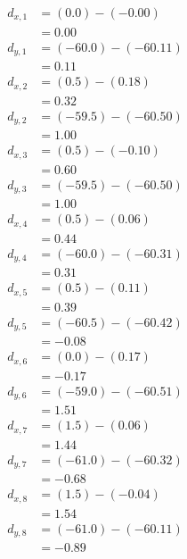 \documentclass[twocolumn]{article}
\begin{document}
\begin{align}
d_{x,1} &= (0.0) - (-0.00) \nonumber\\
 &= 0.00 \label{dx1}\\
d_{y,1} &= (-60.0) - (-60.11) \nonumber\\
 &= 0.11 \label{dy1}
\end{align}
\begin{align}
d_{x,2} &= (0.5) - (0.18) \nonumber\\
 &= 0.32 \label{dx2}\\
d_{y,2} &= (-59.5) - (-60.50) \nonumber\\
 &= 1.00 \label{dy2}
\end{align}
\begin{align}
d_{x,3} &= (0.5) - (-0.10) \nonumber\\
 &= 0.60 \label{dx3}\\
d_{y,3} &= (-59.5) - (-60.50) \nonumber\\
 &= 1.00 \label{dy3}
\end{align}
\begin{align}
d_{x,4} &= (0.5) - (0.06) \nonumber\\
 &= 0.44 \label{dx4}\\
d_{y,4} &= (-60.0) - (-60.31) \nonumber\\
 &= 0.31 \label{dy4}
\end{align}
\begin{align}
d_{x,5} &= (0.5) - (0.11) \nonumber\\
 &= 0.39 \label{dx5}\\
d_{y,5} &= (-60.5) - (-60.42) \nonumber\\
 &= -0.08 \label{dy5}
\end{align}
\begin{align}
d_{x,6} &= (0.0) - (0.17) \nonumber\\
 &= -0.17 \label{dx6}\\
d_{y,6} &= (-59.0) - (-60.51) \nonumber\\
 &= 1.51 \label{dy6}
\end{align}
\begin{align}
d_{x,7} &= (1.5) - (0.06) \nonumber\\
 &= 1.44 \label{dx7}\\
d_{y,7} &= (-61.0) - (-60.32) \nonumber\\
 &= -0.68 \label{dy7}
\end{align}
\begin{align}
d_{x,8} &= (1.5) - (-0.04) \nonumber\\
 &= 1.54 \label{dx8}\\
d_{y,8} &= (-61.0) - (-60.11) \nonumber\\
 &= -0.89 \label{dy8}
\end{align}
\end{document}
